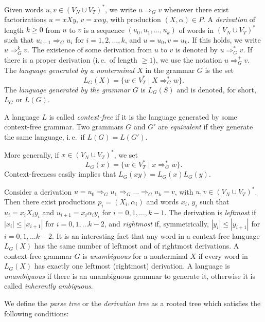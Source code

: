 Given words $u, v \in (V_N \cup V_T)^*$, we write $u \Rightarrow_G v$ whenever there exist factorizations $u = x X y$, $v = x \alpha y$, with production $(X, \alpha) \in P$. A \emph{derivation} of length $k \ge 0$ from $u$ to $v$ is a sequence $(u_0, u_1, \ldots, u_k)$ of words in $(V_N \cup V_T)^*$ such that $u_{i-1} \Rightarrow_G u_i$ for $i = 1, 2, \ldots, k$, and $u = u_0, v = u_k$. If this holds, we write $u \Rightarrow^k_G v$. The existence of some derivation from $u$ to $v$ is denoted by $u \Rightarrow^*_G v$. If there is a proper derivation
(i.\,e.\ of length $\ge 1$), we use the notation $u \Rightarrow^+_G v$. The \emph{language generated by a nonterminal $X$} in the grammar $G$ is the set
$$L_G(X) = \{w \in V_T^* \mid X \Rightarrow^*_G w\}.$$ The \emph{language generated by the grammar $G$} is $L_G(S)$ and is denoted, for short, $L_G$ or $L(G)$.

A language $L$ is called \emph{context-free} if it is the language generated by some context-free grammar. Two grammars $G$ and $G'$ are \emph{equivalent} if they generate the same language, i.\,e.\ if $L(G) = L(G')$.

More generally, if $x \in (V_N \cup V_T)^*$, we set $$L_G(x) = \{w \in V_T^* \mid x \Rightarrow^*_G w\}.$$ Context-freeness easily implies that $L_G(xy) = L_G(x) L_G(y)$.

Consider a derivation $u = u_0 \Rightarrow_G u_1 \Rightarrow_G \ldots \Rightarrow_G u_k = v$, with $u, v \in (V_N \cup V_T)^*$. Then there exist productions $p_i = (X_i, \alpha_i)$ and words $x_i$, $y_i$ such that $u_i = x_i X_i y_i$ and $u_{i+1} = x_i \alpha_i y_i$ for $i = 0, 1, \ldots, k-1$. The derivation is \emph{leftmost} if $|x_i| \le |x_{i+1}|$ for $i = 0, 1, \ldots k-2$, and \emph{rightmost} if, symmetrically, $|y_i| \le |y_{i+1}|$ for $i = 0, 1, \ldots k-2$. It is an interesting fact that any word in a context-free language $L_G(X)$ has the same number of leftmost and of rightmost derivations. A context-free grammar $G$ is \emph{unambiguous} for a nonterminal $X$ if every word in $L_G(X)$ has exactly one leftmost (rightmost) derivation. A language is \emph{unambiguous} if there is an unambiguous grammar to generate it, otherwise it is called \emph{inherently ambiguous}.

We define the \emph{parse tree} or the \emph{derivation tree} as a rooted tree which satisfies the following conditions:

